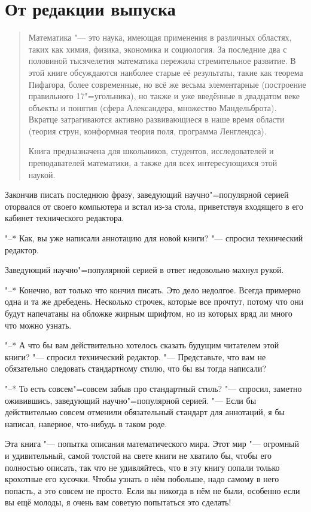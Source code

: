 \chapter*{От редакции выпуска}

\begin{quotation}
Математика "--- это наука, имеющая применения в различных областях, таких как
химия, физика, экономика и социология.
За последние два с половиной тысячелетия математика пережила стремительное
развитие.
В этой книге обсуждаются наиболее старые её результаты, такие как теорема
Пифагора, более современные, но всё же весьма элементарные (построение
правильного 17"=угольника), но также и уже введённые в двадцатом веке объекты и
понятия (сфера Александера, множество Мандельброта).
Вкратце затрагиваются активно развивающиеся в наше время области (теория струн,
конформная теория поля, программа Ленглендса).

Книга предназначена для школьников, студентов, исследователей и преподавателей
математики, а также для всех интересующихся этой наукой.
\end{quotation}

Закончив писать последнюю фразу, заведующий научно"=популярной серией оторвался
от своего компьютера и встал из-за стола, приветствуя входящего в его кабинет
технического редактора.

"--* Как, вы уже написали аннотацию для новой книги? "--- спросил технический
редактор.

Заведующий научно"=популярной серией в ответ недовольно махнул рукой.

"--* Конечно, вот только что кончил писать.
Это дело недолгое.
Всегда примерно одна и та же дребедень.
Несколько строчек, которые все прочтут, потому что они будут напечатаны на
обложке жирным шрифтом, но из которых вряд ли много что можно узнать.

"--* А что бы вам действительно хотелось сказать будущим читателем этой книги?
"--- спросил технический редактор.
"--- Представьте, что вам не обязательно следовать стандартному стилю, что бы вы
тогда написали?

"--* То есть совсем"=совсем забыв про стандартный стиль? "--- спросил, заметно
оживившись, заведующий научно"=популярной серией.
"--- Если бы действительно совсем отменили обязательный стандарт для аннотаций,
я бы написал, наверное, что-нибудь в таком роде.

\medskip
Эта книга "--- попытка описания математического мира.
Этот мир "--- огромный и удивительный, самой толстой на свете книги не хватило
бы, чтобы его полностью описать, так что не удивляйтесь, что в эту книгу попали
только крохотные его кусочки.
Чтобы узнать о нём побольше, надо самому в него попасть, а это совсем не просто.
Если вы никогда в нём не были, особенно если вы ещё молоды, я очень вам советую
попытаться это сделать!

